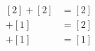 \documentclass[preview]{standalone}
\begin{document}
\begin{align*}
\begin{aligned}[2] + [2] &= [2] \\[1] + [1] &= [2] \\[2] + [1] &= [1] \\\end{aligned}
\end{align*}
\end{document}
